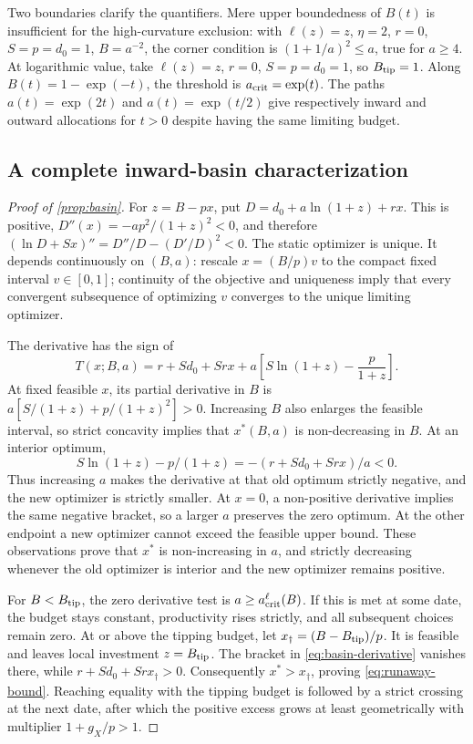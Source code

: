 Two boundaries clarify the quantifiers. Mere upper boundedness of
$B(t)$ is insufficient for the high-curvature exclusion: with
$\ell(z)=z$, $\eta=2$, $r=0$, $S=p=d_0=1$, $B=a^{-2}$, the
corner condition is $(1+1/a)^2\leq a$, true for $a\geq4$.
At logarithmic value, take $\ell(z)=z$, $r=0$, $S=p=d_0=1$,
so $B_{\rm tip}=1$. Along $B(t)=1-\exp(-t)$, the threshold is
$a_{\rm crit}=\exp(t)$. The paths $a(t)=\exp(2t)$ and
$a(t)=\exp(t/2)$ give respectively inward and outward allocations
for $t>0$ despite having the same limiting budget.

\subsection{A complete inward-basin characterization}
\label{app:basin-proof}
\begin{proof}[Proof of \cref{prop:basin}]
For $z=B-px$, put $D=d_0+a\ln(1+z)+rx$. This is positive,
$D''(x)=-ap^2/(1+z)^2<0$, and therefore
$(\ln D+Sx)''=D''/D-(D'/D)^2<0$.
The static optimizer is unique. It depends continuously on $(B,a)$:
rescale $x=(B/p)v$ to the compact fixed interval $v\in[0,1]$;
continuity of the objective and uniqueness imply that every convergent
subsequence of optimizing $v$ converges to the unique limiting
optimizer.

The derivative has the sign of
\begin{equation}
 T(x;B,a)=r+Sd_0+Sr x+
       a\left[S\ln(1+z)-\frac{p}{1+z}\right].
 \label{eq:basin-derivative}
\end{equation}
At fixed feasible $x$, its partial derivative in $B$ is
$a[S/(1+z)+p/(1+z)^2]>0$. Increasing $B$ also enlarges the
feasible interval, so strict concavity implies that $x^*(B,a)$ is
non-decreasing in $B$. At an interior optimum,
\[
 S\ln(1+z)-p/(1+z)=-(r+Sd_0+Sr x)/a<0.
\]
Thus increasing $a$ makes the derivative at that old optimum strictly
negative, and the new optimizer is strictly smaller. At $x=0$, a
non-positive derivative implies the same negative bracket, so a larger
$a$ preserves the zero optimum. At the other endpoint a new optimizer
cannot exceed the feasible upper bound. These observations prove that
$x^*$ is non-increasing in $a$, and strictly decreasing whenever the
old optimizer is interior and the new optimizer remains positive.

For $B<B_{\rm tip}$, the zero derivative test is
$a\geq a_{\rm crit}^{\ell}(B)$. If this is met at some date, the
budget stays constant, productivity rises strictly, and all subsequent
choices remain zero. At or above the tipping budget, let
$x_\dagger=(B-B_{\rm tip})/p$. It is feasible and leaves local
investment $z=B_{\rm tip}$. The bracket in \cref{eq:basin-derivative}
vanishes there, while $r+Sd_0+Sr x_\dagger>0$.
Consequently $x^*>x_\dagger$, proving \cref{eq:runaway-bound}.
Reaching equality with the tipping budget is followed by a strict
crossing at the next date, after which the positive excess grows at
least geometrically with multiplier $1+g_X/p>1$.


\end{proof}
